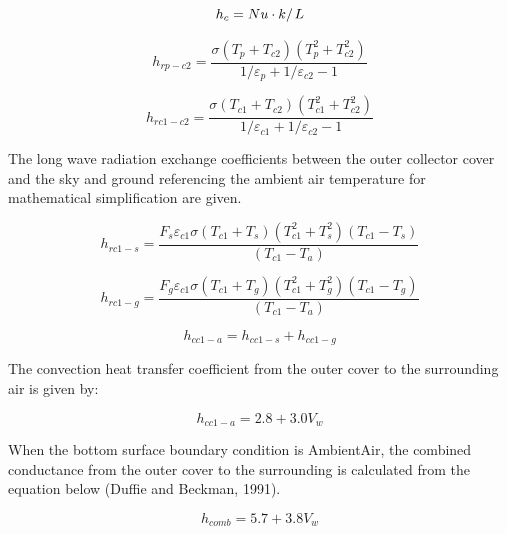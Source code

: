 \begin{equation}
{h_c} = {{Nu \cdot k} \mathord{\left/ {\vphantom {{Nu \cdot k} L}} \right. } L}
\end{equation}

\begin{equation}
{h_{rp - c2}} = \frac{{\sigma \left( {{T_p} + {T_{c2}}} \right)\left( {T_p^2 + T_{c2}^2} \right)}}{{1/{\varepsilon_p} + 1/{\varepsilon_{c2}} - 1}}
\end{equation}

\begin{equation}
{h_{rc1 - c2}} = \frac{{\sigma \left( {{T_{c1}} + {T_{c2}}} \right)\left( {T_{c1}^2 + T_{c2}^2} \right)}}{{1/{\varepsilon_{c1}} + 1/{\varepsilon_{c2}} - 1}}
\end{equation}

The long wave radiation exchange coefficients between the outer collector cover and the sky and ground referencing the ambient air temperature for mathematical simplification are given.

\begin{equation}
{h_{rc1 - s}} = \frac{{{F_s}{\varepsilon_{c1}}\sigma \left( {{T_{c1}} + {T_s}} \right)\left( {T_{c1}^2 + T_s^2} \right)\left( {{T_{c1}} - {T_s}} \right)}}{{\left( {{T_{c1}} - {T_a}} \right)}}
\end{equation}

\begin{equation}
{h_{rc1 - g}} = \frac{{{F_g}{\varepsilon_{c1}}\sigma \left( {{T_{c1}} + {T_g}} \right)\left( {T_{c1}^2 + T_g^2} \right)\left( {{T_{c1}} - {T_g}} \right)}}{{\left( {{T_{c1}} - {T_a}} \right)}}
\end{equation}

\begin{equation}
{h_{cc1 - a}} = {h_{cc1 - s}} + {h_{cc1 - g}}
\end{equation}

The convection heat transfer coefficient from the outer cover to the surrounding air is given by:

\begin{equation}
{h_{cc1 - a}} = 2.8 + 3.0{V_w}
\end{equation}

When the bottom surface boundary condition is AmbientAir, the combined conductance from the outer cover to the surrounding is calculated from the equation below (Duffie and Beckman, 1991).

\begin{equation}
{h_{comb}} = 5.7 + 3.8{V_w}
\end{equation}

